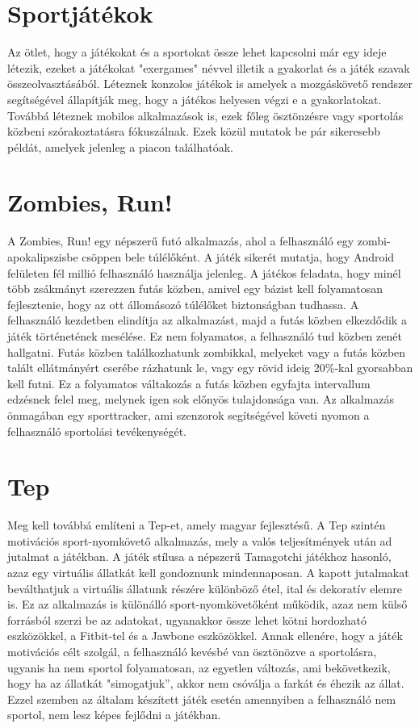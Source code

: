 \section{Sportjátékok}
\label{sportjatekok}

Az ötlet, hogy a játékokat és a sportokat össze lehet kapcsolni már egy ideje létezik, ezeket a játékokat "exergames" névvel illetik a gyakorlat és a játék szavak összeolvasztásából. 
Léteznek konzolos játékok is amelyek a mozgáskövető rendszer segítségével állapítják meg, hogy a játékos helyesen végzi e a gyakorlatokat. 
Továbbá léteznek mobilos alkalmazások is, ezek főleg ösztönzésre vagy sportolás közbeni szórakoztatásra fókuszálnak. 
Ezek közül mutatok be pár sikeresebb példát, amelyek jelenleg a piacon találhatóak. 

\section*{Zombies, Run!}
\label{zombiesrun}

A Zombies, Run! egy népszerű futó alkalmazás, ahol a felhasználó egy zombi-apokalipszisbe csöppen bele túlélőként. 
A játék sikerét mutatja, hogy Android felületen fél millió felhasználó használja jelenleg. 
A játékos feladata, hogy minél több zsákmányt szerezzen futás közben, amivel egy bázist kell folyamatosan fejlesztenie, hogy az ott állomásozó túlélőket biztonságban tudhassa. 
A felhasználó kezdetben elindítja az alkalmazást, majd a futás közben elkezdődik a játék történetének mesélése. 
Ez nem folyamatos, a felhasználó tud közben zenét hallgatni. 
Futás közben találkozhatunk zombikkal, melyeket vagy a futás közben talált ellátmányért cserébe rázhatunk le, vagy egy rövid ideig 20\%-kal gyorsabban kell futni. 
Ez a folyamatos váltakozás a futás közben egyfajta intervallum edzésnek felel meg, melynek igen sok előnyös tulajdonsága van. 
Az alkalmazás önmagában egy sporttracker, ami szenzorok segítségével követi nyomon a felhasználó sportolási tevékenységét.

\section*{Tep}
\label{tep}

Meg kell továbbá említeni a Tep-et, amely magyar fejlesztésű. 
A Tep szintén motivációs sport-nyomkövető alkalmazás, mely a valós teljesítmények után ad jutalmat a játékban. 
A játék stílusa a népszerű Tamagotchi játékhoz hasonló, azaz egy virtuális állatkát kell gondoznunk mindennaposan. 
A kapott jutalmakat beválthatjuk a virtuális állatunk részére különböző étel, ital és dekoratív elemre is. 
Ez az alkalmazás is különálló sport-nyomkövetőként működik, azaz nem külső forrásból szerzi be az adatokat, ugyanakkor össze lehet kötni hordozható eszközökkel, a Fitbit-tel és a Jawbone eszközökkel. 
Annak ellenére, hogy a játék motivációs célt szolgál, a felhasználó kevésbé van ösztönözve a sportolásra, ugyanis ha nem sportol folyamatosan, az egyetlen változás, ami bekövetkezik, hogy ha az állatkát "simogatjuk”, akkor nem csóválja a farkát és éhezik az állat. 
Ezzel szemben az általam készített játék esetén amennyiben a felhasználó nem sportol, nem lesz képes fejlődni a játékban. 

